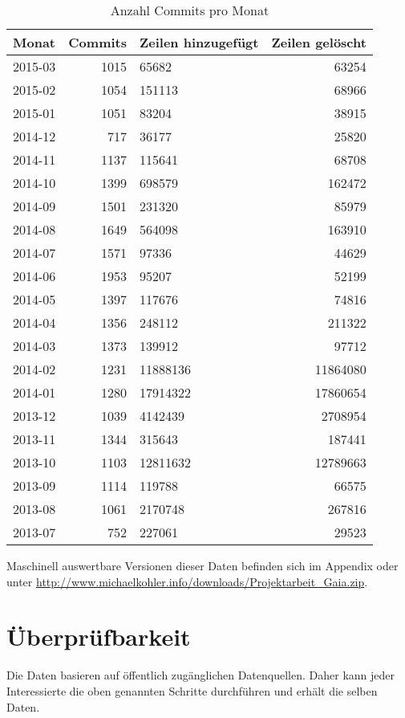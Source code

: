 \begin{table}%
\begin{tabularx}{\textwidth}{p{}|r|X|r}
Monat & Commits & Zeilen hinzugefügt & Zeilen gelöscht\\
\hline
2015-03	& 1015	& 65682	& 63254\\
\hline
2015-02	& 1054	& 151113	& 68966\\
\hline
2015-01	& 1051	& 83204	& 38915\\
\hline
2014-12	& 717	& 36177	& 25820\\
\hline
2014-11	& 1137	& 115641	& 68708\\
\hline
2014-10	& 1399	& 698579	& 162472\\
\hline
2014-09	& 1501	& 231320	& 85979\\
\hline
2014-08	& 1649	& 564098	& 163910\\
\hline
2014-07	& 1571	& 97336	& 44629\\
\hline
2014-06	& 1953	& 95207	& 52199\\
\hline
2014-05	& 1397	& 117676	& 74816\\
\hline
2014-04	& 1356	& 248112	& 211322\\
\hline
2014-03	& 1373	& 139912	& 97712\\
\hline
2014-02	& 1231	& 11888136	& 11864080\\
\hline
2014-01	& 1280	& 17914322	& 17860654\\
\hline
2013-12	& 1039	& 4142439	& 2708954\\
\hline
2013-11	& 1344	& 315643	& 187441\\
\hline
2013-10	& 1103	& 12811632	& 12789663\\
\hline
2013-09	& 1114	& 119788	& 66575\\
\hline
2013-08	& 1061	& 2170748	& 267816\\
\hline
2013-07	& 752	& 227061	& 29523\\
\end{tabularx}
\caption{Anzahl Commits pro Monat}
\end{table}%

Maschinell auswertbare Versionen dieser Daten befinden sich im Appendix oder unter \url{http://www.michaelkohler.info/downloads/Projektarbeit_Gaia.zip}.

\section{Überprüfbarkeit}
Die Daten basieren auf öffentlich zugänglichen Datenquellen. Daher kann jeder Interessierte die oben genannten Schritte durchführen und erhält die selben Daten.